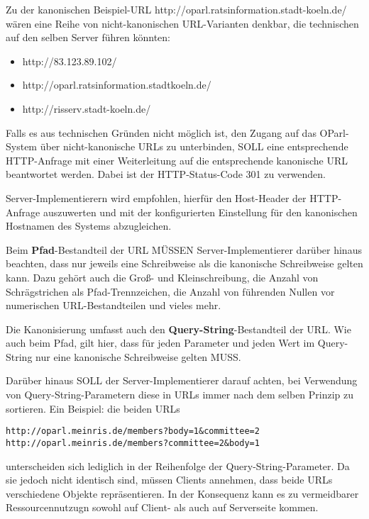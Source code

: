 \documentclass[,a4paper]{article}
\begin{document}
Zu der kanonischen Beispiel-URL
http://oparl.ratsinformation.stadt-koeln.de/ wären eine Reihe von
nicht-kanonischen URL-Varianten denkbar, die technischen auf den selben
Server führen könnten:

\begin{itemize}
\itemsep1pt\parskip0pt
\item
  http://83.123.89.102/
\item
  http://oparl.ratsinformation.stadtkoeln.de/
\item
  http://risserv.stadt-koeln.de/
\end{itemize}

Falls es aus technischen Gründen nicht möglich ist, den Zugang auf das
OParl-System über nicht-kanonische URLs zu unterbinden, SOLL eine
entsprechende HTTP-Anfrage mit einer Weiterleitung auf die entsprechende
kanonische URL beantwortet werden. Dabei ist der HTTP-Status-Code 301 zu
verwenden.

Server-Implementierern wird empfohlen, hierfür den Host-Header der
HTTP-Anfrage auszuwerten und mit der konfigurierten Einstellung für den
kanonischen Hostnamen des Systems abzugleichen.

Beim \textbf{Pfad}-Bestandteil der URL MÜSSEN Server-Implementierer
darüber hinaus beachten, dass nur jeweils eine Schreibweise als die
kanonische Schreibweise gelten kann. Dazu gehört auch die Groß- und
Kleinschreibung, die Anzahl von Schrägstrichen als Pfad-Trennzeichen,
die Anzahl von führenden Nullen vor numerischen URL-Bestandteilen und
vieles mehr.

Die Kanonisierung umfasst auch den \textbf{Query-String}-Bestandteil der
URL. Wie auch beim Pfad, gilt hier, dass für jeden Parameter und jeden
Wert im Query-String nur eine kanonische Schreibweise gelten MUSS.

Darüber hinaus SOLL der Server-Implementierer darauf achten, bei
Verwendung von Query-String-Parametern diese in URLs immer nach dem
selben Prinzip zu sortieren. Ein Beispiel: die beiden URLs

\begin{verbatim}
http://oparl.meinris.de/members?body=1&committee=2
http://oparl.meinris.de/members?committee=2&body=1
\end{verbatim}

unterscheiden sich lediglich in der Reihenfolge der
Query-String-Parameter. Da sie jedoch nicht identisch sind, müssen
Clients annehmen, dass beide URLs verschiedene Objekte repräsentieren.
In der Konsequenz kann es zu vermeidbarer Ressourcennutzugn sowohl auf
Client- als auch auf Serverseite kommen.
\end{document}
